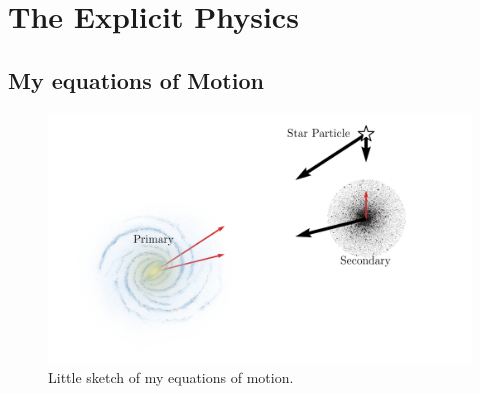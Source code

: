 



\section{The Explicit Physics}
    \subsection*{My equations of Motion} \label{subsec:myEquationsOfMotion}
    \begin{figure}
        \centering
        \includegraphics[width=\linewidth]{images/restricted_three_body_set_up.png}
        \caption{Little sketch of my equations of motion. }
    \end{figure}

